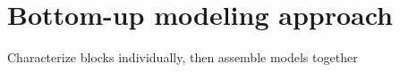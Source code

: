\section{Bottom-up modeling approach}

Characterize blocks individually, then assemble models together
